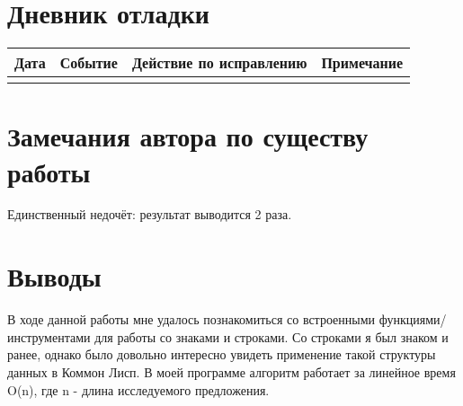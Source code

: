 \documentclass[12pt]{article}
\begin{document}
\section{Дневник отладки}
\begin{tabular}{|p{50pt}|p{130pt}|p{130pt}|p{70pt}|}
\hline
Дата & Событие & Действие по исправлению & Примечание \\ \hline
& & &\\
\hline
\end{tabular}

\section{Замечания автора по существу работы}
Единственный недочёт: результат выводится 2 раза.

\section{Выводы}
В ходе данной работы мне удалось познакомиться со встроенными функциями/инструментами для работы со знаками и строками. Со строками я был знаком и ранее, однако было довольно интересно увидеть применение такой структуры данных в Коммон Лисп. В моей программе алгоритм работает за линейное время O(n), где n - длина исследуемого предложения.
\end{document}
